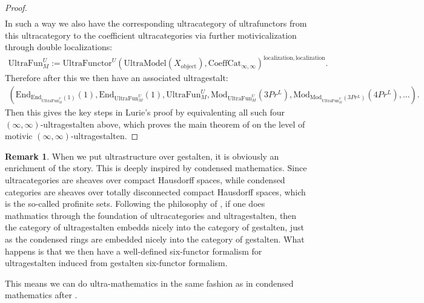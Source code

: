 \documentclass[12pt]{article}
\theoremstyle{definition}
\newtheorem{remark}{Remark}
\begin{document}
\begin{proof}
\begin{align}
\end{align}
In such a way we also have the corresponding ultracategory of ultrafunctors from this ultracategory to the coefficient ultracategories via further motivicalization through double localizations:
\begin{align}
\mathrm{UltraFun}_M^U:=\mathrm{UltraFunctor}^U({\mathrm{UltraModel}(X_\mathrm{object})},\mathrm{CoeffCat}_{\infty,\infty})^{\mathrm{localization}, \mathrm{localization}}.
\end{align}
Therefore after this we then have an associated ultragestalt:
\begin{align}
(\mathrm{End}_{\mathrm{End}_{\mathrm{UltraFun}_M^U}(1)}(1),\mathrm{End}_{\mathrm{UltraFun}_M^U}(1),\mathrm{UltraFun}_M^U,\mathrm{Mod}_{\mathrm{UltraFun}_M^U}(3Pr^L),\mathrm{Mod}_{\mathrm{Mod}_{\mathrm{UltraFun}_M^U}(3Pr^L)}(4Pr^L),...).
\end{align} 
Then this gives the key steps in Lurie's proof by equivalenting all such four $(\infty,\infty)$-ultragestalten above, which proves the main theorem of \cite{5Lu3} on the level of motivic $(\infty,\infty)$-ultragestalten.
\end{proof}


\begin{remark}
When we put ultrastructure over gestalten, it is obviously an enrichment of the story. This is deeply inspired by condensed mathematics. Since ultracategories are sheaves over compact Hausdorff spaces, while condensed categories are sheaves over totally disconnected compact Hausdorff spaces, which is the so-called profinite sets. Following the philosophy of \cite{5S5}, if one does mathmatics through the foundation of ultracategories and ultragestalten, then the category of ultragestalten embedds nicely into the category of gestalten, just as the condensed rings are embedded nicely into the category of gestalten. What happens is that we then have a well-defined six-functor formalism for ultragestalten induced from gestalten six-functor formalism.

\end{remark}

This means we can do ultra-mathematics in the same fashion as in condensed mathematics after \cite{CS1}. 
\end{document}
